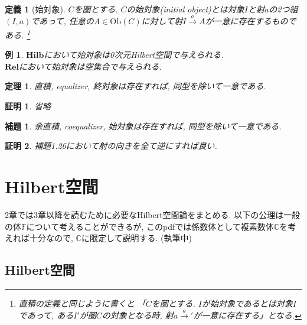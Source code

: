 \documentclass[a4paper,12pt]{ltjsarticle}
\theoremstyle{break}
\newtheorem{defn}[thm]{定義}
\newtheorem{lem}[thm]{補題}
\newtheorem{thrm}[thm]{定理}
\newtheorem{eg}[thm]{例}
\newtheorem*{prf}{証明}
\newcommand{\rel}{\mathbf{Rel}}
\newcommand{\hilb}{\mathbf{Hilb}}
\newcommand{\mbc}{\mathbb{C}}
\newcommand{\Ob}{\mathrm{Ob}}
\newcommand{\xr}[1]{\xrightarrow{#1}}
\numberwithin{equation}{section}
\begin{document}
\begin{defn}[始対象]
  $C$を圏とする. 
  $C$の始対象(initial object)とは対象$I$と射$a$の2つ組$(I,a)$であって, 任意の$A \in \Ob(C)$に対して射$I \xr{a} A$が一意に存在するものである.
  \footnote{
    直積の定義と同じように書くと 「$C$を圏とする. 
    $I$が始対象であるとは対象$I$であって, ある$I'$が圏$C$の対象となる時, 射$a \xr a'$が一意に存在する」となる. 
  } 
\end{defn}

\begin{eg}
  $\hilb$において始対象は0次元Hilbert空間で与えられる. \\
  $\rel$において始対象は空集合で与えられる. 
\end{eg}

\begin{thrm}
  直積, equalizer, 終対象は存在すれば, 同型を除いて一意である. 
\end{thrm}

\begin{prf}
  省略
\end{prf}

\begin{lem}
  余直積, coequalizer, 始対象は存在すれば, 同型を除いて一意である. 
\end{lem}  

\begin{prf}
  補題1.26において射の向きを全て逆にすれば良い. 
\end{prf}

\newpage

\section{Hilbert空間}

2章では3章以降を読むために必要なHilbert空間論をまとめる.  
以下の公理は一般の体$\mathbb{F}$について考えることができるが, このpdfでは係数体として複素数体$\mbc$を考えれば十分なので, $\mbc$に限定して説明する.
(執筆中)

\subsection{Hilbert空間}
\end{document}
